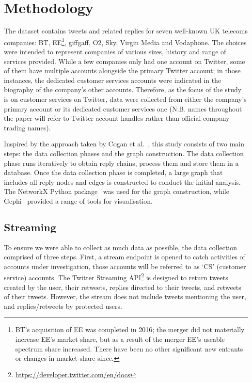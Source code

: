 \documentclass[sigconf]{acmart}
\begin{document}
\section{Methodology}\label{method}

The dataset contains tweets and related replies for seven well-known
UK telecoms companies: BT, EE\footnote{BT's acquisition of EE was
completed in 2016; the merger did not materially increase EE's market
share, but as a result of the merger EE's useable spectrum share
increased. There have been no other significant new entrants or
changes in market share since.}, giffgaff, O2, Sky, Virgin Media and
Vodaphone. The choices were intended to represent companies of various
sizes, history and range of services provided. While a few companies
only had one account on Twitter, some of them have multiple
accounts alongside the primary Twitter account; in those instances,
the dedicated customer services accounts were indicated in the
biography of the company's other accounts. Therefore, as the focus of
the study is on customer services on Twitter, data were collected from
either the company's primary account or its dedicated customer services
one (N.B. names throughout the paper will refer to Twitter account handles
rather than official company trading names).

Inspired by the approach taken by Cogan et al.~\cite{Cogan2012}, this
study consists of two main steps: the data collection phases and the
graph construction. The data collection phase runs iteratively to obtain
reply chains, process them and store them in a database. Once the data
collection phase is completed, a large graph that includes all reply
nodes and edges is constructed to conduct the initial analysis. The
NetworkX Python package~\cite{Hagberg2008} was used for the graph
construction, while Gephi~\cite{Bastian2009} provided a range of tools
for visualisation.


\subsection{Streaming}

To ensure we were able to collect as much data as possible, the data
collection comprised of three steps. First, a stream endpoint is
opened to catch activities of accounts under investigation, those
accounts will be referred to as `CS' (customer service)
accounts. The Twitter Streaming
API\footnote{\url{https://developer.twitter.com/en/docs}} is designed
to return tweets created by the user, their retweets, replies directed
to their tweets, and retweets of their tweets. However, the stream
does not include tweets mentioning the user, and replies/retweets by
protected users.
\end{document}
